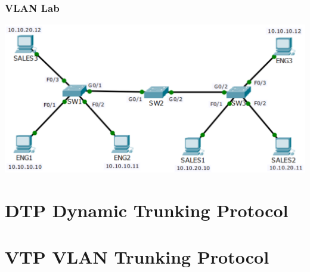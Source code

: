 \documentclass[pdflatex,compress,mathserif]{beamer}
\begin{document}
\begin{frame}
	\frametitle{VLAN Lab}
	\begin{center}
		\includegraphics[width=\linewidth]{img/img32}
	\end{center}
\end{frame}

\section{DTP Dynamic Trunking Protocol}

\section{VTP VLAN Trunking Protocol}
\end{document}
